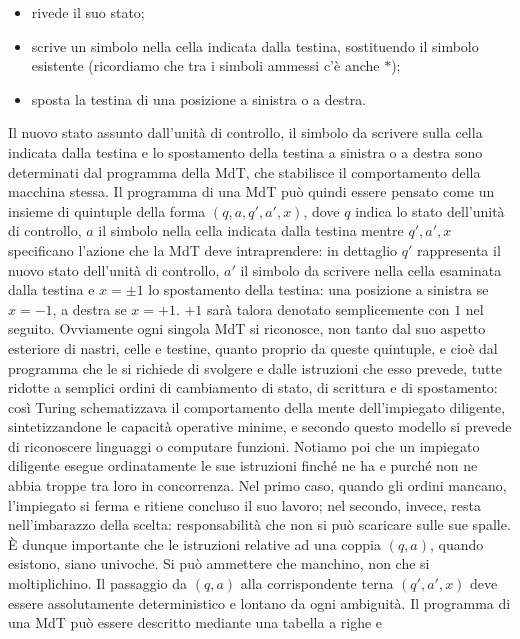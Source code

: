 \begin{itemize}
    \item rivede il suo stato;
    \item scrive un simbolo nella cella indicata dalla testina, sostituendo il
          simbolo esistente (ricordiamo che tra i simboli ammessi c'è anche $*$);
    \item sposta la testina di una posizione a sinistra o a destra.
\end{itemize}

Il nuovo stato assunto dall'unità di controllo, il simbolo da scrivere sulla cella
indicata dalla testina e lo spostamento della testina a sinistra o a destra sono
determinati dal programma della MdT, che stabilisce il comportamento della macchina
stessa. Il programma di una MdT può quindi essere pensato come un insieme
di quintuple della forma $(q, a, q', a', x)$, dove $q$ indica lo stato dell'unità
di controllo, $a$ il simbolo nella cella indicata dalla testina mentre $q', a' , x$
specificano l'azione che la MdT deve intraprendere:
in dettaglio $q'$ rappresenta il nuovo stato
dell'unità di controllo, $a'$ il simbolo da scrivere nella cella esaminata
dalla testina e $x = \pm 1$ lo spostamento della testina: una posizione a sinistra
se $x = -1$, a destra se $x = +1$. $+1$ sarà talora denotato semplicemente con $1$
nel seguito.
Ovviamente ogni singola MdT si riconosce, non tanto dal suo aspetto esteriore di
nastri, celle e testine, quanto proprio da queste quintuple, e cioè dal programma
che le si richiede di svolgere e dalle istruzioni che esso prevede,
tutte ridotte a
semplici ordini di cambiamento di stato, di scrittura e di spostamento: così Turing
schematizzava il comportamento della mente dell'impiegato diligente,
sintetizzandone le capacità operative minime, e secondo questo modello si
prevede di
riconoscere linguaggi o computare funzioni.
Notiamo poi che un impiegato diligente esegue ordinatamente le sue istruzioni
finché ne ha e purché non ne abbia troppe tra loro in concorrenza. Nel primo caso,
quando gli ordini mancano, l'impiegato si ferma e ritiene concluso il suo lavoro;
nel secondo, invece, resta nell'imbarazzo della scelta: responsabilità che non si
può scaricare sulle sue spalle.
È dunque importante che le istruzioni relative ad una coppia $(q, a)$,
quando esistono, siano univoche. Si può ammettere che manchino, non che si
moltiplichino. Il
passaggio da $(q, a)$ alla corrispondente terna $(q', a', x)$ deve essere
assolutamente deterministico e lontano da ogni ambiguità.
Il programma di una MdT può essere descritto mediante una tabella a righe e
